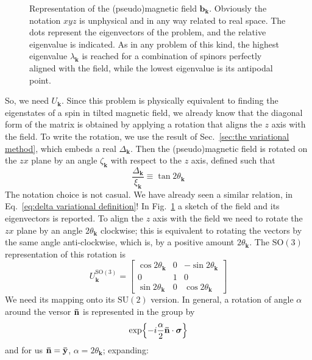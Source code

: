 \begin{figure}
	\centering
	
	\caption{Representation of the (pseudo)magnetic field $\mathbf{b}_\mathbf{k}$. Obviously the notation $xyz$ is unphysical and in any way related to real space. The dots represent the eigenvectors of the problem, and the relative eigenvalue is indicated. As in any problem of this kind, the highest eigenvalue $\lambda_\mathbf{k}$ is reached for a combination of spinors perfectly aligned with the field, while the lowest eigenvalue is its antipodal point.}
	\label{fig:pseudo magnetic field}
\end{figure}

So, we need $U_\mathbf{k}$. Since this problem is physically equivalent to finding the eigenstates of a spin in tilted magnetic field, we already know that the diagonal form of the matrix is obtained by applying a rotation that aligns the $z$ axis with the field. To write the rotation, we use the result of Sec.~\ref{sec:the variational method}, which embeds a real $\Delta_\mathbf{k}$. Then the (pseudo)magnetic field is rotated on the $zx$ plane by an angle $\zeta_\mathbf{k}$ with respect to the $z$ axis, defined such that
\begin{equation}\label{eq:tangent self consistent definition}
	\frac{\Delta_\mathbf{k}}{\xi_\mathbf{k}} \equiv  \tan 2\theta_\mathbf{k}
\end{equation}
The notation choice is not casual. We have already seen a similar relation, in Eq.~\eqref{eq:delta variational definition}! In Fig.~\ref{fig:pseudo magnetic field} a sketch of the field and its eigenvectors is reported. To align the $z$ axis with the field we need to rotate the $zx$ plane by an angle $2\theta_\mathbf{k}$ clockwise; this is equivalent to rotating the vectors by the same angle anti-clockwise, which is, by a positive amount $2\theta_\mathbf{k}$.
The $\mathrm{SO}(3)$ representation of this rotation is
\[
	U_\mathbf{k}^{\mathrm{SO}(3)} = \begin{bmatrix}
		\cos 2\theta_\mathbf{k} & 0 & - \sin 2\theta_\mathbf{k} \\
		0 & 1 & 0 \\
		\sin 2\theta_\mathbf{k} & 0 & \cos 2\theta_\mathbf{k}
	\end{bmatrix}
\]
We need its mapping onto its $\mathrm{SU}(2)$ version. In general, a rotation of angle $\alpha$ around the versor $\mathbf{\bar{n}}$ is represented in the group by
\[
	\exp{- i \frac{\alpha}{2} \ensuremath{\mathbf{\bar{n}}} \cdot \bm{\sigma}}
\]
and for us $\mathbf{\bar{n}} = \mathbf{\bar{y}}$, $\alpha = 2\theta_\mathbf{k}$; expanding:
